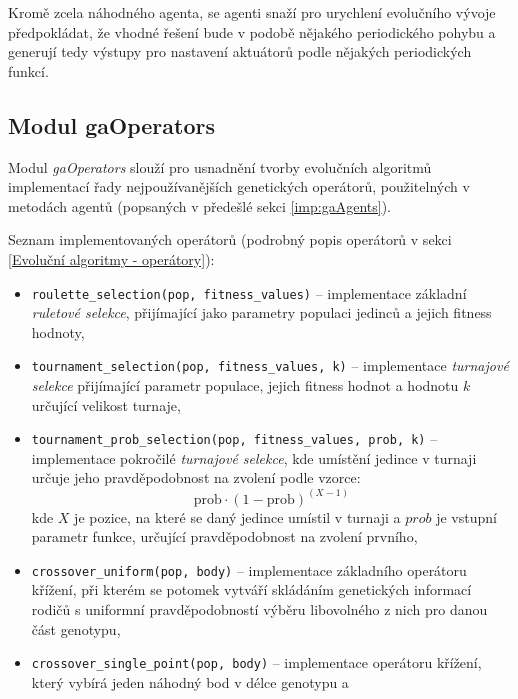 Kromě zcela náhodného agenta, se agenti snaží pro urychlení evolučního vývoje
předpokládat, že vhodné řešení bude v podobě nějakého periodického pohybu a
generují tedy výstupy pro nastavení aktuátorů podle nějakých periodických
funkcí. 

\subsection{Modul gaOperators} \label{imp:gaOperators}
Modul \emph{gaOperators} slouží pro usnadnění tvorby evolučních algoritmů
implementací řady nejpoužívanějších genetických operátorů, použitelných v
metodách agentů (popsaných v předešlé sekci \ref{imp:gaAgents}). 

Seznam implementovaných operátorů (podrobný popis operátorů v sekci
\ref{Evoluční algoritmy - operátory}):
\begin{itemize}
    \item \texttt{roulette\_selection(pop, fitness\_values)} -- implementace
        základní \linebreak \emph{ruletové selekce}, přijímající jako parametry
        populaci jedinců a jejich fitness hodnoty,
    \item \texttt{tournament\_selection(pop, fitness\_values, k)} --
        implementace \linebreak \emph{turnajové selekce} přijímající parametr populace,
        jejich fitness hodnot a hodnotu $k$ určující velikost turnaje,
    \item \texttt{tournament\_prob\_selection(pop, fitness\_values, prob, k)}
        -- implementace pokročilé \emph{turnajové selekce}, kde umístění
        jedince v turnaji určuje jeho pravděpodobnost na zvolení podle vzorce:
        \begin{equation}
            \text{prob}\cdot(1-\text{prob})^{(X-1)}
        \end{equation}
        kde $X$ je pozice, na které se daný jedince umístil v turnaji a $prob$
        je vstupní parametr funkce, určující pravděpodobnost na zvolení prvního,
    \item \texttt{crossover\_uniform(pop, body)} -- implementace základního
        operátoru \linebreak křížení, při kterém se potomek vytváří skládáním
        genetických informací rodičů s uniformní pravděpodobností výběru
        libovolného z nich pro danou část genotypu,
    \item \texttt{crossover\_single\_point(pop, body)} -- implementace
        operátoru křížení, který vybírá jeden náhodný bod v délce genotypu a

\end{itemize}
